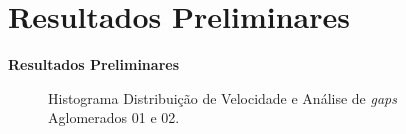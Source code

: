 \documentclass[xcolor=dvipsnames,10pt]{beamer}
\begin{document}
\section{Resultados Preliminares}
\begin{frame}{\textbf{Resultados Preliminares}}
  \begin{figure}[!htbp]
    \centering
    \caption{Histograma Distribuição de Velocidade e Análise de \textit{gaps} Aglomerados 01 e 02.}
    \label{fig:fig4}%
  \end{figure}
\end{frame}
\end{document}
